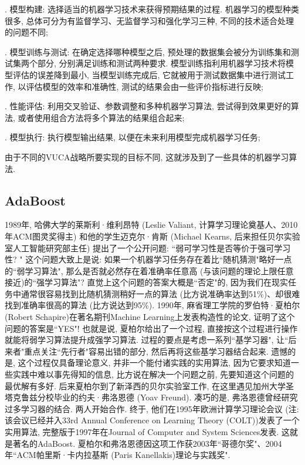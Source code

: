 . 模型构建: 选择适当的机器学习技术来获得预期结果的过程. 机器学习的模型种类很多, 总体可分为有监督学习、无监督学习和强化学习三种, 不同的技术适合处理的问题不同;

. 模型训练与测试: 在确定选择哪种模型之后, 预处理的数据集会被分为训练集和测试集两个部分, 分别满足训练和测试两种要求.
模型训练指利用机器学习技术将模型评估的误差降到最小, 当模型训练完成后, 它就被用于测试数据集中进行测试工作, 以评估模型的效率和准确性, 测试的结果会由一些评价指标进行反映;

. 性能评估: 利用交叉验证、参数调整和多种机器学习算法, 尝试得到效果更好的算法, 或者使用组合方法将多个算法的结果组合起来;

. 模型执行: 执行模型输出结果, 以便在未来利用模型完成机器学习任务;

由于不同的VUCA战略所要实现的目标不同, 这就涉及到了一些具体的机器学习算法.
\subsection{AdaBoost}
\begin{remark}
1989年, 哈佛大学的莱斯利·维利昂特 (Leslie Valiant, 计算学习理论奠基人、2010年ACM图灵奖得主) 和他的学生迈克尔·肯斯 (Michael Kearns, 后来担任贝尔实验室人工智能研究部主任) 提出了一个公开问题: “弱可学习性是否等价于强可学习性? "
这个问题大致上是说: 如果一个机器学习任务存在着比“随机猜测"略好一点的“弱学习算法", 那么是否就必然存在着准确率任意高 (与该问题的理论上限任意接近)的“强学习算法"?
直觉上这个问题的答案大概是“否定"的, 因为我们在现实任务中通常很容易找到比随机猜测稍好一点的算法 (比方说准确率达到51\%)、却很难找到准确率很高的算法 (比方说达到95\%).
1990年, 麻省理工学院的罗伯特·夏柏尔 (Robert Schapire)在著名期刊Machine Learning上发表构造性的论文, 证明了这个问题的答案是“YES"!
也就是说, 夏柏尔给出了一个过程, 直接按这个过程进行操作就能将弱学习算法提升成强学习算法. 过程的要点是考虑一系列“基学习器", 让“后来者"重点关注“先行者"容易出错的部分, 然后再将这些基学习器结合起来.
遗憾的是, 这个过程仅具备理论意义, 并非一个能付诸实践的实用算法, 因为它要求知道一些实践中难以事先得知的信息, 比方说在解决一个问题之前, 先要知道这个问题的最优解有多好.
后来夏柏尔到了新泽西的贝尔实验室工作, 在这里遇见加州大学圣塔克鲁兹分校毕业的约夫·弗洛恩德 (Yoav Freund). 凑巧的是, 弗洛恩德曾经研究过多学习器的结合. 两人开始合作.
终于, 他们在1995年欧洲计算学习理论会议 (注: 该会议已经并入33rd Annual Conference on Learning Theory (COLT))发表了一个实用算法, 完整版于1997年在Journal of Computer and System Sciences发表. 这就是著名的AdaBoost.
夏柏尔和弗洛恩德因这项工作获2003年“哥德尔奖"、2004年“ACM帕里斯·卡内拉基斯 (Paris Kanellakis)理论与实践奖".
\end{remark}

